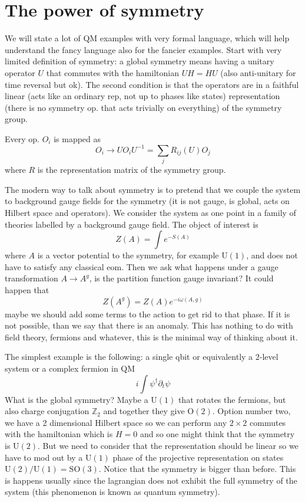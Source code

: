 \documentclass[11pt]{article}
\theoremstyle{definition}
\numberwithin{equation}{section}
\newcommand*\bbZ{\mathbb{Z}}
\newcommand*\U{\mathrm{U}}
\newcommand*\SO{\mathrm{SO}}
\newcommand*\OO{\mathrm{O}}
\begin{document}
\section{The power of symmetry}
We will state a lot of QM examples with very formal language, which will help understand the fancy language also for the fancier examples. Start with very limited definition of symmetry: a global symmetry means having a unitary operator $U$ that commutes with the hamiltonian $UH=HU$ (also anti-unitary for time reversal but ok). The second condition is that the operators are in a faithful linear (acts like an ordinary rep, not up to phases like states) representation (there is no symmetry op. that acts trivially on everything) of the symmetry group. 

Every op. $O_{i}$ is mapped as 
\begin{equation}
	O_{i}\rightarrow U O_{i}U^{-1}=\sum_{j}R_{ij}(U)O_{j}
\end{equation}
where $R$ is the representation matrix of the symmetry group.

The modern way to talk about symmetry is to pretend that we couple the system to background gauge fields for the symmetry (it is not gauge, is global, acts on Hilbert space and operators). We consider the system as one point in a family of theories labelled by a background gauge field. The object of interest is 
\begin{equation}
	Z(A)=\int e^{-S(A)}
\end{equation}
where $A$ is a vector potential to the symmetry, for example $\U(1)$, and does not have to satisfy any classical eom. Then we ask what happens under a gauge transformation $A\rightarrow A^{g}$, is the partition function gauge invariant? It could happen that
\begin{equation}
	Z(A^{g})=Z(A)e^{-i\omega(A,g)}
\end{equation}
maybe we should add some terms to the action to get rid to that phase. If it is not possible, than we say that there is an anomaly. This has nothing to do with field theory, fermions and whatever, this is the minimal way of thinking about it.

The simplest example is the following: a single qbit or equivalently a $2$-level system or a complex fermion in QM
\begin{equation}
	i\int\psi^{\dagger}\partial_{t}\psi
\end{equation}
What is the global symmetry? Maybe a $\U(1)$ that rotates the fermions, but also charge conjugation $\bbZ_{2}$ and together they give $\OO(2)$. Option number two, we have a 2 dimensional Hilbert space so we can perform any $2\times 2$ commutes with the hamiltonian which is $H=0$ and so one might think that the symmetry is $\U(2)$. But we need to consider that the representation should be linear so we have to mod out by a $\U(1)$ phase of the projective representation on states $\U(2)/\U(1)=\SO(3)$. Notice that the symmetry is bigger than before. This is happens usually since the lagrangian does not exhibit the full symmetry of the system (this phenomenon is known as quantum symmetry).
\end{document}
